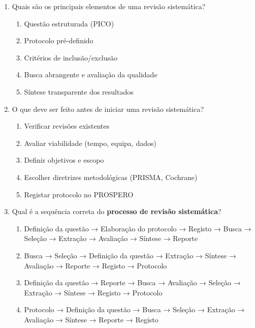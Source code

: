 \documentclass[12pt,a4paper]{article}
\begin{document}
\begin{enumerate}[label=\textbf{Q\arabic*:}]
\item Quais são os principais elementos de uma revisão sistemática?
\begin{enumerate}[label=\alph*)]
    \item Questão estruturada (PICO)
    \item Protocolo pré-definido
    \item Critérios de inclusão/exclusão
    \item Busca abrangente e avaliação da qualidade
    \item Síntese transparente dos resultados
\end{enumerate}

\item O que deve ser feito antes de iniciar uma revisão sistemática?
\begin{enumerate}[label=\alph*)]
    \item Verificar revisões existentes
    \item Avaliar viabilidade (tempo, equipa, dados)
    \item Definir objetivos e escopo
    \item Escolher diretrizes metodológicas (PRISMA, Cochrane)
    \item Registar protocolo no PROSPERO
\end{enumerate}

\item Qual é a sequência correta do \textbf{processo de revisão sistemática}?
\begin{enumerate}[label=\alph*)]
    \item Definição da questão → Elaboração do protocolo → Registo → Busca → Seleção → Extração → Avaliação → Síntese → Reporte
    \item Busca → Seleção → Definição da questão → Extração → Síntese → Avaliação → Reporte → Registo → Protocolo
    \item Definição da questão → Reporte → Busca → Avaliação → Seleção → Extração → Síntese → Registo → Protocolo
    \item Protocolo → Definição da questão → Busca → Seleção → Extração → Avaliação → Síntese → Reporte → Registo
\end{enumerate}

\end{enumerate}
\end{document}
